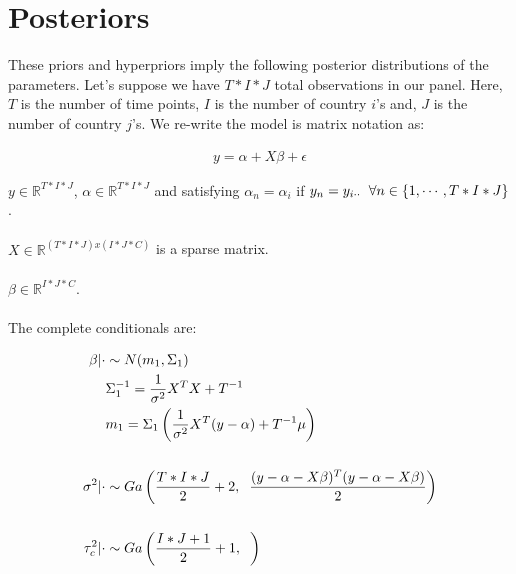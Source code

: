 \documentclass[paper=a4, fontsize=11pt]{scrartcl} %
\numberwithin{equation}{section} %
\numberwithin{figure}{section} %
\numberwithin{table}{section} %
\begin{document}
\section{Posteriors}

These priors and hyperpriors imply the following posterior distributions of the parameters.  Let's suppose we have $T*I*J$ total observations in our panel.  Here, $T$ is the number of time points, $I$ is the number of country $i$'s and, $J$ is the number of country $j$'s.  We re-write the model is matrix notation as:

\begin{align}
	y = \alpha + X\beta + \epsilon
\end{align}

$y \in \mathbb{R}^{T*I*J}$, $\alpha \in \mathbb{R}^{T*I*J}$ and satisfying $\alpha_{n} = \alpha_{i}$ if $y_{n} = y_{i \cdot \cdot} \hspace{2mm} \forall n \in \{1, \cdots, T*I*J\}$.
\\
\\
 $X \in \mathbb{R}^{(T*I*J) x (I*J*C)}$ is a sparse matrix.
\\
\\ 
$\beta \in \mathbb{R}^{I*J*C}$. 
\\
\\
The complete conditionals are:

\begin{align}
	\beta \vert \cdot &\sim N(m_{1},\Sigma_{1})
	\\
	& \Sigma_{1}^{-1} = \frac{1}{\sigma^{2}}X^{T}X + T^{-1} \nonumber
	\\
	& m_{1} = \Sigma_{1} \left( \frac{1}{\sigma^{2}}  X^{T}( y-\alpha ) + T^{-1} \mu \right) \nonumber
	\\ \nonumber
	\\
	\sigma^{2} \vert \cdot &\sim Ga\left(\frac{T*I*J}{2} + 2 , \hspace{2mm} \frac{(y-\alpha- X\beta)^{T}(y-\alpha- X\beta)}{2}\right)
	\\ \nonumber
	\\
	\tau_{c}^{2} \vert \cdot &\sim Ga\left( \frac{I*J +1}{2} + 1, \hspace{2mm}  \right)
\end{align}
\end{document}
